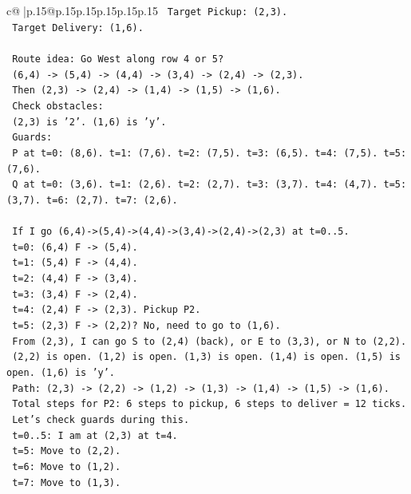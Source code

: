 \documentclass{article}
\begin{document}
{\begin{supertabular}{c@{$\;$}|p{.15\linewidth}@{}p{.15\linewidth}p{.15\linewidth}p{.15\linewidth}p{.15\linewidth}p{.15\linewidth}}
{{{\texttt{    Target Pickup: (2,3).} \\
\texttt{    Target Delivery: (1,6).} \\
\\ 
\texttt{    Route idea: Go West along row 4 or 5?} \\
\texttt{    (6,4) {-}> (5,4) {-}> (4,4) {-}> (3,4) {-}> (2,4) {-}> (2,3).} \\
\texttt{    Then (2,3) {-}> (2,4) {-}> (1,4) {-}> (1,5) {-}> (1,6).} \\
\texttt{    Check obstacles:} \\
\texttt{    (2,3) is '2'. (1,6) is 'y'.} \\
\texttt{    Guards:} \\
\texttt{    P at t=0: (8,6). t=1: (7,6). t=2: (7,5). t=3: (6,5). t=4: (7,5). t=5: (7,6).} \\
\texttt{    Q at t=0: (3,6). t=1: (2,6). t=2: (2,7). t=3: (3,7). t=4: (4,7). t=5: (3,7). t=6: (2,7). t=7: (2,6).} \\
\\ 
\texttt{    If I go (6,4){-}>(5,4){-}>(4,4){-}>(3,4){-}>(2,4){-}>(2,3) at t=0..5.} \\
\texttt{    t=0: (6,4) F {-}> (5,4).} \\
\texttt{    t=1: (5,4) F {-}> (4,4).} \\
\texttt{    t=2: (4,4) F {-}> (3,4).} \\
\texttt{    t=3: (3,4) F {-}> (2,4).} \\
\texttt{    t=4: (2,4) F {-}> (2,3). Pickup P2.} \\
\texttt{    t=5: (2,3) F {-}> (2,2)? No, need to go to (1,6).} \\
\texttt{    From (2,3), I can go S to (2,4) (back), or E to (3,3), or N to (2,2).} \\
\texttt{    (2,2) is open. (1,2) is open. (1,3) is open. (1,4) is open. (1,5) is open. (1,6) is 'y'.} \\
\texttt{    Path: (2,3) {-}> (2,2) {-}> (1,2) {-}> (1,3) {-}> (1,4) {-}> (1,5) {-}> (1,6).} \\
\texttt{    Total steps for P2: 6 steps to pickup, 6 steps to deliver = 12 ticks.} \\
\texttt{    Let's check guards during this.} \\
\texttt{    t=0..5: I am at (2,3) at t=4.} \\
\texttt{    t=5: Move to (2,2).} \\
\texttt{    t=6: Move to (1,2).} \\
\texttt{    t=7: Move to (1,3).} \\
}}}
\end{supertabular}}
\end{document}
